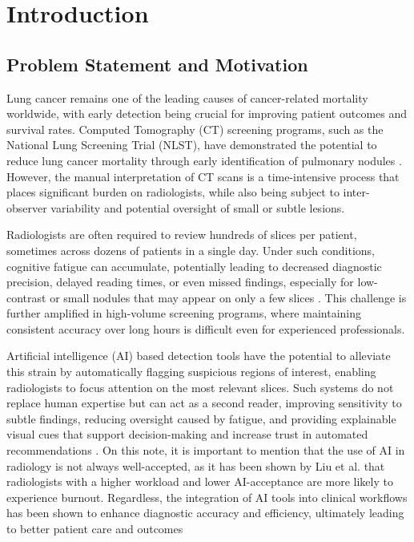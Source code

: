 \chapter{Introduction}
\label{ch:introduction}

\section{Problem Statement and Motivation}

Lung cancer remains one of the leading causes of cancer-related mortality worldwide, with early detection being crucial for improving patient outcomes and survival rates. Computed Tomography (CT) screening programs, such as the National Lung Screening Trial (NLST), have demonstrated the potential to reduce lung cancer mortality through early identification of pulmonary nodules \cite{aberle2011reduced, de2020reduced}. However, the manual interpretation of CT scans is a time-intensive process that places significant burden on radiologists, while also being subject to inter-observer variability and potential oversight of small or subtle lesions.

Radiologists are often required to review hundreds of slices per patient, sometimes across dozens of patients in a single day. Under such conditions, cognitive fatigue can accumulate, potentially leading to decreased diagnostic precision, delayed reading times, or even missed findings, especially for low-contrast or small nodules that may appear on only a few slices \cite{stec2018systematic, taylor2019fatigue}. This challenge is further amplified in high-volume screening programs, where maintaining consistent accuracy over long hours is difficult even for experienced professionals.

Artificial intelligence (AI) based detection tools have the potential to alleviate this strain by automatically flagging suspicious regions of interest, enabling radiologists to focus attention on the most relevant slices. Such systems do not replace human expertise but can act as a second reader, improving sensitivity to subtle findings, reducing oversight caused by fatigue, and providing explainable visual cues that support decision-making and increase trust in automated recommendations \cite{glikson2020human}. 
On this note, it is important to mention that the use of AI in radiology is not always well-accepted, as it has been shown by Liu et al. \cite{liu2024artificial} that radiologists with a higher workload and lower AI-acceptance are more likely to experience burnout. Regardless, the integration of AI tools into clinical workflows has been shown to enhance diagnostic accuracy  and efficiency, ultimately leading to better patient care and outcomes \cite{guermazi2022improving,huynh2020artificial}

